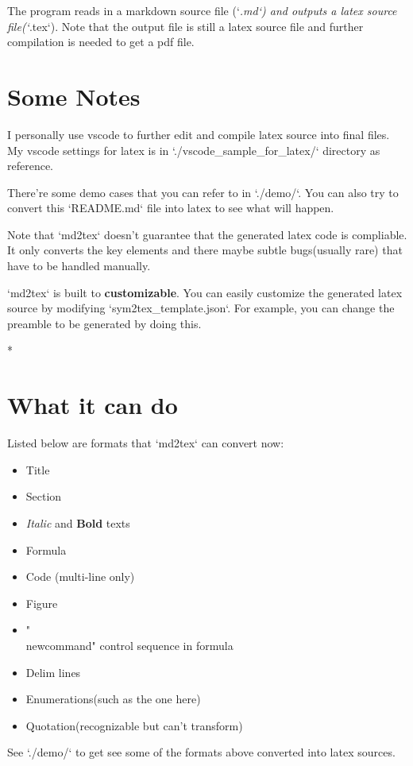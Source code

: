 \documentclass[UTF8]{ctexart}
\begin{document}
The program reads in a markdown source file (`\emph{.md`) and outputs a latex source file(`}.tex`). Note that the output file is still a latex source file and further compilation is needed to get a pdf file. 

\section{Some Notes}

I personally use vscode to further edit and compile latex source into final files. My vscode settings for latex is in `./vscode\_sample\_for\_latex/` directory as reference.

There're some demo cases that you can refer to in `./demo/`. You can also try to convert this `README.md` file into latex to see what will happen.

Note that `md2tex` doesn't guarantee that the generated latex code is compliable. It only converts the key elements and there maybe subtle bugs(usually rare) that have to be handled manually.

`md2tex` is built to \textbf{customizable}.  You can easily customize the generated latex source by modifying `sym2tex\_template.json`. For example, you can change the preamble to be generated by doing this.

\begin{center}
	*\quad*\quad*
\end{center}

\section{What it can do}

Listed below are formats that `md2tex` can convert now:

\begin{itemize}	\item Title
	\item Section
	\item \emph{Italic} and \textbf{Bold} texts
	\item Formula
	\item Code (multi-line only)
	\item Figure
	\item "\\newcommand" control sequence in formula
	\item Delim lines
	\item Enumerations(such as the one here)
	\item Quotation(recognizable but can't transform)
\end{itemize}
See `./demo/` to get see some of the formats above converted into latex sources.
\end{document}
